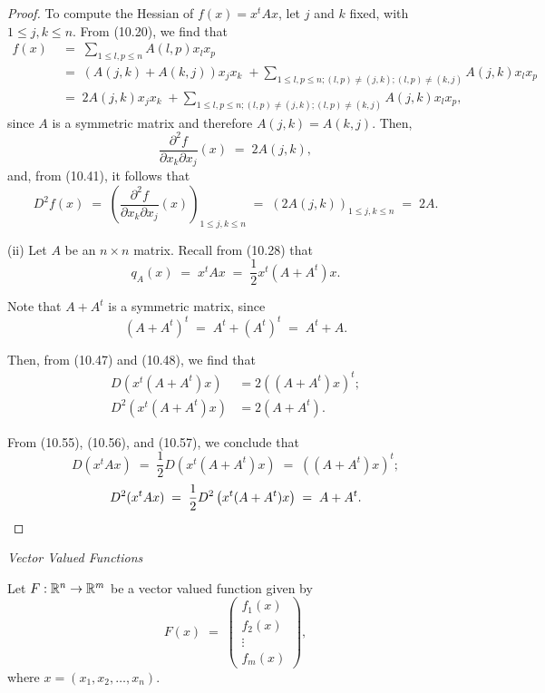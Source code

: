 \begin{proof}
To compute the Hessian of $f(x) = x^tAx$, let $j$ and $k$ fixed, with $1 \le j,k \le
n$. From (10.20), we find that
\begin{align*}
f(x) \;&=\; \sum_{1\le l,p\le n} A(l,p)x_lx_p \\
&=\; (A(j,k)+A(k,j))x_jx_k \;+\!\!\sum_{1\le l,p\le n;(l,p)\ne(j,k);(l,p)\ne(k,j)}\!\! A(j,k)x_lx_p \\
&=\; 2A(j,k)x_jx_k \;+\!\!\sum_{1\le l,p\le n;(l,p)\ne(j,k);(l,p)\ne(k,j)}\!\! A(j,k)x_lx_p,
\end{align*}
since $A$ is a symmetric matrix and therefore $A(j,k) = A(k,j)$. Then,
\[
\frac{\partial^2 f}{\partial x_k\partial x_j}(x) \;=\; 2A(j,k),
\]
and, from (10.41), it follows that
\[
D^2f(x) \;=\; \left(\frac{\partial^2 f}{\partial x_k\partial x_j}(x)\right)_{1\le j,k\le n}
\;=\; (2A(j,k))_{1\le j,k\le n} \;=\; 2A.
\]

(ii) Let $A$ be an $n \times n$ matrix. Recall from (10.28) that
\begin{equation}
q_A(x) \;=\; x^tAx \;=\; \frac12 x^t(A+A^t)x.
\end{equation}

Note that $A+A^t$ is a symmetric matrix, since
\[
(A+A^t)^t \;=\; A^t+(A^t)^t \;=\; A^t+A.
\]

Then, from (10.47) and (10.48), we find that
\begin{align}
D\left(x^t(A+A^t)x\right) &= 2\left((A+A^t)x\right)^t; \\
D^2\left(x^t(A+A^t)x\right) &= 2(A+A^t).
\end{align}

From (10.55), (10.56), and (10.57), we conclude that
\[
D(x^tAx) \;=\; \frac12 D\left(x^t(A+A^t)x\right) \;=\; \left((A+A^t)x\right)^t;
\]
\[
D^2(x^tAx) \;=\; \frac12 D^2\left(x^t(A+A^t)x\right) \;=\; A+A^t.
\qedhere
\]
\end{proof}

\textit{Vector Valued Functions}

Let $F : \mathbb{R}^n \to \mathbb{R}^m$ be a vector valued function given by
\[
F(x) \;=\; \begin{pmatrix} f_1(x) \\ f_2(x) \\ \vdots \\ f_m(x) \end{pmatrix},
\]
where $x = (x_1,x_2,\ldots,x_n)$.

